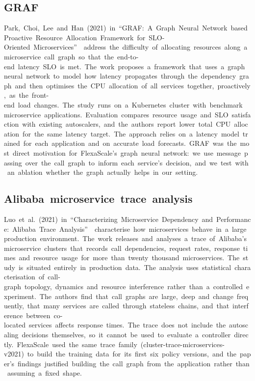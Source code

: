 \documentclass[12pt,a4paper,oneside]{report}
\begin{document}
\subsection{GRAF}

Park,~Choi,~Lee~and~Han~(2021)~in~``GRAF:~A~Graph~Neural~Network~based~Proactive~Resource~Allocation~Framework~for~SLO-Oriented~Microservices''~\cite{graf}~address~the~difficulty~of~allocating~resources~along~a~microservice~call~graph~so~that~the~end-to-end~latency~SLO~is~met.~The~work~proposes~a~framework~that~uses~a~graph~neural~network~to~model~how~latency~propagates~through~the~dependency~graph~and~then~optimises~the~CPU~allocation~of~all~services~together,~proactively,~as~the~front-end~load~changes.~The~study~runs~on~a~Kubernetes~cluster~with~benchmark~microservice~applications.~Evaluation~compares~resource~usage~and~SLO~satisfaction~with~existing~autoscalers,~and~the~authors~report~lower~total~CPU~allocation~for~the~same~latency~target.~The~approach~relies~on~a~latency~model~trained~for~each~application~and~on~accurate~load~forecasts.~GRAF~was~the~most~direct~motivation~for~FlexaScale's~graph~neural~network:~we~use~message~passing~over~the~call~graph~to~inform~each~service's~decision,~and~we~test~with~an~ablation~whether~the~graph~actually~helps~in~our~setting.


\clearpage

\subsection{Alibaba~microservice~trace~analysis}

Luo~et~al.~(2021)~in~``Characterizing~Microservice~Dependency~and~Performance:~Alibaba~Trace~Analysis''~\cite{alibaba}~characterise~how~microservices~behave~in~a~large~production~environment.~The~work~releases~and~analyses~a~trace~of~Alibaba's~microservice~clusters~that~records~call~dependencies,~request~rates,~response~times~and~resource~usage~for~more~than~twenty~thousand~microservices.~The~study~is~situated~entirely~in~production~data.~The~analysis~uses~statistical~characterisation~of~call-graph~topology,~dynamics~and~resource~interference~rather~than~a~controlled~experiment.~The~authors~find~that~call~graphs~are~large,~deep~and~change~frequently,~that~many~services~are~called~through~stateless~chains,~and~that~interference~between~co-located~services~affects~response~times.~The~trace~does~not~include~the~autoscaling~decisions~themselves,~so~it~cannot~be~used~to~evaluate~a~controller~directly.~FlexaScale~used~the~same~trace~family~(cluster-trace-microservices-v2021)~to~build~the~training~data~for~its~first~six~policy~versions,~and~the~paper's~findings~justified~building~the~call~graph~from~the~application~rather~than~assuming~a~fixed~shape.
\end{document}

